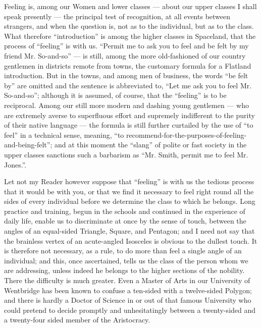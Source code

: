 \documentclass[12pt, a4paper, twoside]{memoir}
\begin{document}
Feeling is, among our Women and lower classes --- about our upper classes I
shall speak presently --- the principal test of recognition, at all events
between strangers, and when the question is, not as to the individual, but as
to the class. What therefore ``introduction'' is among the higher classes in
Spaceland, that the process of ``feeling'' is with us. ``Permit me to ask you to
feel and be felt by my friend Mr. So-and-so'' --- is still, among the more
old-fashioned of our country gentlemen in districts remote from towns, the
customary formula for a Flatland introduction. But in the towns, and among men
of business, the words ``be felt by'' are omitted and the sentence is
abbreviated to, ``Let me ask you to feel Mr. So-and-so''; although it is
assumed, of course, that the ``feeling'' is to be reciprocal. Among our still
more modern and dashing young gentlemen --- who are extremely averse to
superfluous effort and supremely indifferent to the purity of their native
language --- the formula is still further curtailed by the use of ``to feel'' in a
technical sense, meaning, ``to
recommend-for-the-purposes-of-feeling-and-being-felt''; and at this moment the
``slang'' of polite or fast society in the upper classes sanctions such a
barbarism as ``Mr. Smith, permit me to feel Mr. Jones.''.

Let not my Reader however suppose that ``feeling'' is with us the tedious
process that it would be with you, or that we find it necessary to feel right
round all the sides of every individual before we determine the class to which
he belongs. Long practice and training, begun in the schools and continued in
the experience of daily life, enable us to discriminate at once by the sense
of touch, between the angles of an equal-sided Triangle, Square, and Pentagon;
and I need not say that the brainless vertex of an acute-angled Isosceles is
obvious to the dullest touch. It is therefore not necessary, as a rule, to do
more than feel a single angle of an individual; and this, once ascertained,
tells us the class of the person whom we are addressing, unless indeed he
belongs to the higher sections of the nobility. There the difficulty is much
greater. Even a Master of Arts in our University of Wentbridge has been known
to confuse a ten-sided with a twelve-sided Polygon; and there is hardly a
Doctor of Science in or out of that famous University who could pretend to
decide promptly and unhesitatingly between a twenty-sided and a twenty-four
sided member of the Aristocracy.
\end{document}
